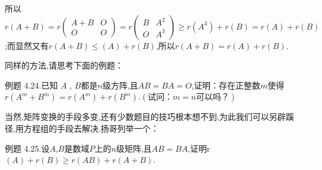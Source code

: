 \documentclass{article}
\begin{document}

所以$r \left(A + B\right)
    =
    r \left(\begin{array}{cc}
            A + B & O \\
            O     & O
        \end{array}\right)
    =
    r \left(\begin{array}{cc}
            B & A^2 \\
            O & A^3
        \end{array}\right)
    \ge
    r \left(A^3\right) + r \left(B\right)
    =
    r \left(A\right) + r \left(B\right)$
;而显然又有$r \left(A + B\right) \le \left(A\right) + r \left(B\right)$,所以$r \left(A + B\right) = r \left(A\right) + r \left(B\right)$.

\vspace{1ex}
同样的方法,请思考下面的例题：

\vspace{1ex}
{\heiti 例题 4.24.}{\kaishu 已知 $A$ , $B$都是$n$级方阵,且$AB = BA =O$,证明：存在正整数$m$使得$r \left(A^m + B^m\right) = r \left(A^m\right) + r\left(B^m\right)$.$\left(\text{试问：}m = n\text{可以吗？}\right)$}

当然,矩阵变换的手段多变,还有少数题目的技巧根本想不到,为此我们可以另辟蹊径,用方程组的手段去解决.扬哥列举一个：

\vspace{1ex}
{\heiti 例题 4.25.}{\kaishu 设$A$,$B$是数域$P$上的$n$级矩阵,且$AB = BA$,证明r $\left(A\right) + r \left(B\right) \ge r \left(AB\right) + r \left(A + B\right)$.}
\end{document}
